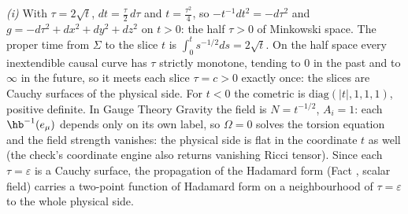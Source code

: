 \emph{(i)} With $\tau = 2\sqrt{t}$, $dt = \tfrac{\tau}{2}\,d\tau$ and $t = \tfrac{\tau^{2}}{4}$, so $-t^{-1}dt^{2} = -d\tau^{2}$ and $g = -d\tau^{2} + dx^{2} + dy^{2} + dz^{2}$ on $t > 0$: the half $\tau > 0$ of Minkowski space. The proper time from $\Sigma$ to the slice $t$ is $\int_{0}^{t}s^{-1/2}ds = 2\sqrt{t}$. On the half space every inextendible causal curve has $\tau$ strictly monotone, tending to $0$ in the past and to $\infty$ in the future, so it meets each slice $\tau = c > 0$ exactly once: the slices are Cauchy surfaces of the physical side. For $t < 0$ the cometric is $\mathrm{diag}(|t|, 1, 1, 1)$, positive definite. In Gauge Theory Gravity the field is $N = t^{-1/2}$, $A_{i} = 1$: each $\hb^{-1}(e_{\mu})$ depends only on its own label, so $\Omega = 0$ solves the torsion equation and the field strength vanishes: the physical side is flat in the coordinate $t$ as well (the check's coordinate engine also returns vanishing Ricci tensor). Since each $\tau = \varepsilon$ is a Cauchy surface, the propagation of the Hadamard form (Fact , scalar field) carries a two-point function of Hadamard form on a neighbourhood of $\tau = \varepsilon$ to the whole physical side.

